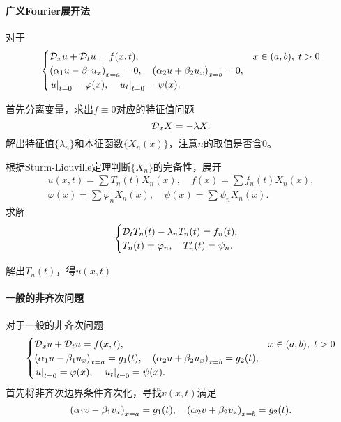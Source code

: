 \paragraph*{广义Fourier展开法}对于 
\begin{align*}
	\begin{cases}
		\mathcal D_xu+\mathcal D_tu=f(x,t),& x\in(a,b),\;t>0\\
		\left(\alpha_1u-\beta_1u_x\right)_{x=a}=0,\quad\left(\alpha_2u+\beta_2u_x\right)_{x=b}=0,\\
		\left.u\right\rvert_{t=0}=\varphi(x),\quad\left.u_t\right\rvert_{t=0}=\psi(x).
	\end{cases}
\end{align*}
\begin{compactenum}
	\item 首先分离变量，求出$f\equiv 0$对应的特征值问题
	\[\mathcal D_xX=-\lambda X.\]
	解出特征值$\{\lambda_n\}$和本征函数$\{X_n(x)\}$，注意$n$的取值是否含0。
	\item 根据Sturm-Liouville定理判断$\{X_n\}$的完备性，展开
	\begin{gather*}
		u(x,t)=\sum T_n(t)X_n(x),\quad f(x)=\sum f_n(t)X_n(x),\\
		\varphi(x)=\sum\varphi_nX_n(x),\quad \psi(x)=\sum\psi_nX_n(x).
	\end{gather*}
	求解 
	\begin{align*}
		\begin{cases}
			\mathcal D_tT_n(t)-\lambda_nT_n(t)=f_n(t),\\
			T_n(t)=\varphi_n,\quad T_n'(t)=\psi_n.
		\end{cases}
	\end{align*}
	\item 解出$T_n(t)$，得$u(x,t)$
\end{compactenum}
\paragraph*{一般的非齐次问题}
对于一般的非齐次问题
\begin{align*}
	\begin{cases}
		\mathcal D_xu+\mathcal D_tu=f(x,t),&x\in(a,b),\;t>0\\
		\left(\alpha_1u-\beta_1u_x\right)_{x=a}=g_1(t),\quad\left(\alpha_2u+\beta_2u_x\right)_{x=b}=g_2(t),\\
		\left.u\right\rvert_{t=0}=\varphi(x),\quad\left.u_t\right\rvert_{t=0}=\psi(x).
	\end{cases}
\end{align*}
首先将非齐次边界条件齐次化，寻找$v(x,t)$满足 
\[
	\left(\alpha_1v-\beta_1v_x\right)_{x=a}=g_1(t),\quad\left(\alpha_2v+\beta_2v_x\right)_{x=b}=g_2(t).
\]

